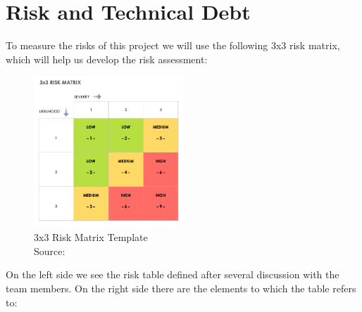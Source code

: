 \section{Risk and Technical Debt}

To measure the risks of this project we will use the following 3x3 risk matrix, which will help us develop the 
\gls{risk assessment}:

\begin{figure}[H]
    \centering
    \includegraphics[width=0.5\textwidth]{assets/Risk-Matrix.png}
    \caption{3x3 Risk Matrix Template\\ Source: \citet{refonline:smtrisk}  }
    \label{fig:risk_matrix_template}
\end{figure}

On the left side we see the risk table  defined after several discussion with the team members.
On the right side there are the elements to which the table refers to:

